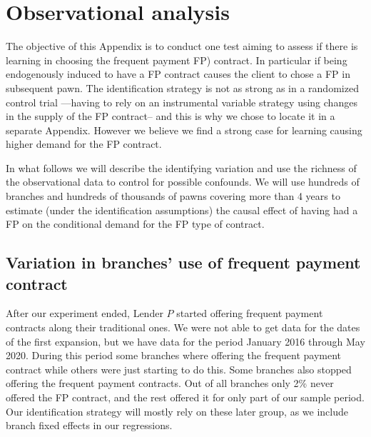 \documentclass[oneside,11pt]{article}
\begin{document}



\newpage
\section{ Observational analysis}
\label{appendix_b}
\vspace{.2in}
\normalsize
\linespread{1.25}
\normalsize
\linespread{1.25}


The objective of this Appendix is to conduct one test aiming to assess if there is learning in choosing the frequent payment FP) contract. In particular if being endogenously induced to have a FP contract causes the client to chose a FP in subsequent pawn. The identification strategy is not as strong as in a randomized control trial ---having to rely on an instrumental variable strategy using changes in the supply of the FP contract-- and this is why we chose to locate it in a separate Appendix. However we believe we find a strong case for learning causing higher demand for the FP contract.

In what follows we will describe the identifying variation and use the richness of the observational data to control for possible confounds. We will use hundreds of branches and hundreds of thousands of pawns covering more than 4 years to estimate (under the identification assumptions) the causal effect of having had a FP on the conditional demand for the FP type of contract.


\vspace{.in}


\subsection{Variation in branches' use of frequent payment contract}

After our experiment ended, Lender $P$ started offering frequent payment contracts along their traditional ones. We were not able to get data for the dates of the first expansion, but we have data for the period January 2016 through May 2020. During this period some branches where offering the frequent payment contract while others were just starting to do this. Some branches also stopped offering the frequent payment contracts. Out of all branches only 2\% never offered the FP contract, and the rest offered it for only part of our sample period. Our identification strategy will mostly rely on these later group, as we include branch fixed effects in our regressions. \\
\end{document}
